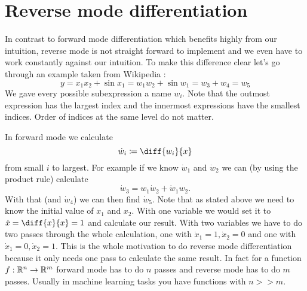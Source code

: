 \section{Reverse mode differentiation}

In contrast to forward mode differentiation which benefits highly from our intuition, reverse mode is not straight forward to implement and we even have to work constantly against our intuition. To make this difference clear let's go through an example taken from Wikipedia \cite{forwardAccumulationWiki}:
\newcommand{\yExampleDiff}{y = x_1x_2 + \sin{x_1} = w_1w_2 + \sin{w_1} = w_3 + w_4 = w_5}
\[ \yExampleDiff \]
We gave every possible subexpression a name $w_i$. Note that the outmost expression has the largest index and the innermost expressions have the smallest indices. Order of indices at the same level do not matter.

In forward mode we calculate 
\[ \dot w_i \coloneqq \diff{w_i}{x} \]
from small $i$ to largest. For example if we know $\dot w_1$ and $\dot w_2$ we can (by using the product rule) calculate 
\[ \dot w_3 = w_1 \dot w_2 + \dot w_1 w_2. \]
With that (and $\dot w_4$) we can then find $\dot w_5$. Note that as stated above we need to know the initial value of $x_1$ and $x_2$. With one variable we would set it to $\dot x = \diff{x}{x} = 1$ and calculate our result. With two variables we have to do two passes through the whole calculation, one with $\dot x_1 = 1, \dot x_2 = 0$ and one with $\dot x_1 = 0, \dot x_2 = 1$. This is the whole motivation to do reverse mode differentiation because it only needs one pass to calculate the same result. In fact for a function $f: \mathbb{R}^n \to \mathbb{R}^m$ forward mode has to do $n$ passes and reverse mode has to do $m$ passes. Usually in machine learning tasks you have functions with $n >\! \!> m$.


